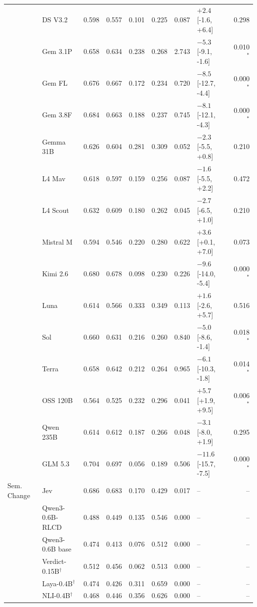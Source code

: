 \begin{longtable}{llrrrrrlr}
 & DS V3.2 & 0.598 & 0.557 & 0.101 & 0.225 & 0.087 & $+2.4$ [-1.6, +6.4] & 0.298 \\
 & Gem 3.1P & 0.658 & 0.634 & 0.238 & 0.268 & 2.743 & $-5.3$ [-9.1, -1.6] & 0.010$^{*}$ \\
 & Gem FL & 0.676 & 0.667 & 0.172 & 0.234 & 0.720 & $-8.5$ [-12.7, -4.4] & 0.000$^{*}$ \\
 & Gem 3.8F & 0.684 & 0.663 & 0.188 & 0.237 & 0.745 & $-8.1$ [-12.1, -4.3] & 0.000$^{*}$ \\
 & Gemma 31B & 0.626 & 0.604 & 0.281 & 0.309 & 0.052 & $-2.3$ [-5.5, +0.8] & 0.210 \\
 & L4 Mav & 0.618 & 0.597 & 0.159 & 0.256 & 0.087 & $-1.6$ [-5.5, +2.2] & 0.472 \\
 & L4 Scout & 0.632 & 0.609 & 0.180 & 0.262 & 0.045 & $-2.7$ [-6.5, +1.0] & 0.210 \\
 & Mistral M & 0.594 & 0.546 & 0.220 & 0.280 & 0.622 & $+3.6$ [+0.1, +7.0] & 0.073 \\
 & Kimi 2.6 & 0.680 & 0.678 & 0.098 & 0.230 & 0.226 & $-9.6$ [-14.0, -5.4] & 0.000$^{*}$ \\
 & Luna & 0.614 & 0.566 & 0.333 & 0.349 & 0.113 & $+1.6$ [-2.6, +5.7] & 0.516 \\
 & Sol & 0.660 & 0.631 & 0.216 & 0.260 & 0.840 & $-5.0$ [-8.6, -1.4] & 0.018$^{*}$ \\
 & Terra & 0.658 & 0.642 & 0.212 & 0.264 & 0.965 & $-6.1$ [-10.3, -1.8] & 0.014$^{*}$ \\
 & OSS 120B & 0.564 & 0.525 & 0.232 & 0.296 & 0.041 & $+5.7$ [+1.9, +9.5] & 0.006$^{*}$ \\
 & Qwen 235B & 0.614 & 0.612 & 0.187 & 0.266 & 0.048 & $-3.1$ [-8.0, +1.9] & 0.295 \\
 & GLM 5.3 & 0.704 & 0.697 & 0.056 & 0.189 & 0.506 & $-11.6$ [-15.7, -7.5] & 0.000$^{*}$ \\
\midrule
Sem. Change & Jev & 0.686 & 0.683 & 0.170 & 0.429 & 0.017 & -- & -- \\
 & Qwen3-0.6B-RLCD & 0.488 & 0.449 & 0.135 & 0.546 & 0.000 & -- & -- \\
 & Qwen3-0.6B base & 0.474 & 0.413 & 0.076 & 0.512 & 0.000 & -- & -- \\
 & Verdict-0.15B$^{\dagger}$ & 0.512 & 0.456 & 0.062 & 0.513 & 0.000 & -- & -- \\
 & Laya-0.4B$^{\dagger}$ & 0.474 & 0.426 & 0.311 & 0.659 & 0.000 & -- & -- \\
 & NLI-0.4B$^{\dagger}$ & 0.468 & 0.446 & 0.356 & 0.626 & 0.000 & -- & -- \\

\end{longtable}
